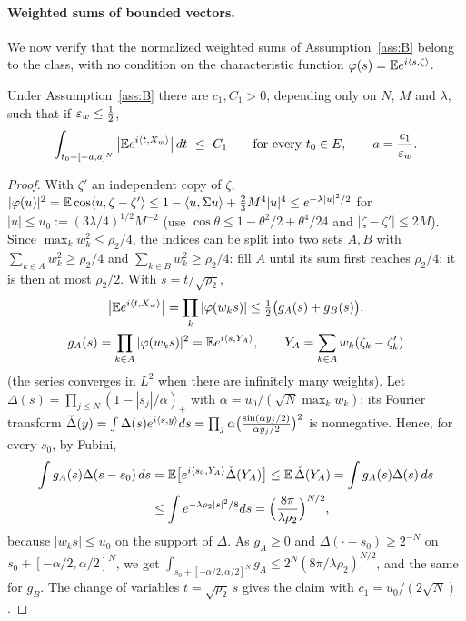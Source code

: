 \paragraph{Weighted sums of bounded vectors.} We now verify that the normalized weighted sums of
Assumption~\ref{ass:B} belong to the class, with no condition on the characteristic function
$\varphi(s)=\mathbb{E} e^{i\langle s, \zeta\rangle}$.

\begin{lemma}\label{lem:cube}
Under Assumption~\ref{ass:B} there are $c_1,C_1>0$, depending only on $N$, $M$ and $\lambda$, such that if $\varepsilon_w\le\frac12$,
\[
\int_{t_0+[-a,a]^N}\big|\mathbb{E} e^{i\langle t, X_w\rangle}\big|\,dt\ \le\ C_1\qquad\text{for every }t_0\in E,\qquad a=\frac{c_1}{\varepsilon_w}.
\]
\end{lemma}
\begin{proof}
With $\zeta'$ an independent copy of $\zeta$,
$|\varphi(u)|^2=\mathbb{E}\cos\langle u, \zeta-\zeta'\rangle\le1-\langle u, \Sigma u\rangle+\frac23M^4|u|^4\le e^{-\lambda|u|^2/2}$ for
$|u|\le u_0:=(3\lambda/4)^{1/2}M^{-2}$ (use $\cos\theta\le1-\theta^2/2+\theta^4/24$ and $|\zeta-\zeta'|\le2M$). Since
$\max_kw_k^2\le\rho_2/4$, the indices can be split into two sets $A,B$ with $\sum_{k\in A}w_k^2\ge\rho_2/4$ and
$\sum_{k\in B}w_k^2\ge\rho_2/4$: fill $A$ until its sum first reaches $\rho_2/4$; it is then at most $\rho_2/2$. With
$s=t/\sqrt{\rho_2}$,
\begin{gather*}
\big|\mathbb{E} e^{i\langle t, X_w\rangle}\big|=\prod_k|\varphi(w_ks)|\le\tfrac12\big(g_A(s)+g_B(s)\big),\\
g_A(s)=\prod_{k\in A}|\varphi(w_ks)|^2=\mathbb{E} e^{i\langle s, Y_A\rangle},\qquad Y_A=\sum_{k\in A}w_k(\zeta_k-\zeta'_k)
\end{gather*}
(the series converges in $L^2$ when there are infinitely many weights). Let $\Delta(s)=\prod_{j\le N}(1-|s_j|/\alpha)_+$
with $\alpha=u_0/(\sqrt N\max_kw_k)$; its Fourier transform
$\check\Delta(y)=\int\Delta(s)e^{i\langle s, y\rangle}ds=\prod_j\alpha\big(\frac{\sin(\alpha y_j/2)}{\alpha y_j/2}\big)^2$ is
nonnegative. Hence, for every $s_0$, by Fubini,
\begin{align*}
\int g_A(s)\Delta(s-s_0)\,ds&=\mathbb{E}\big[e^{i\langle s_0, Y_A\rangle}\check\Delta(Y_A)\big]\le\mathbb{E}\,\check\Delta(Y_A)=\int g_A(s)\Delta(s)\,ds\\
&\le\int e^{-\lambda\rho_2|s|^2/8}ds=\Big(\frac{8\pi}{\lambda\rho_2}\Big)^{N/2},
\end{align*}
because $|w_ks|\le u_0$ on the support of $\Delta$. As $g_A\ge0$ and $\Delta(\cdot-s_0)\ge2^{-N}$ on
$s_0+[-\alpha/2,\alpha/2]^N$, we get $\int_{s_0+[-\alpha/2,\alpha/2]^N}g_A\le2^N(8\pi/\lambda\rho_2)^{N/2}$, and the same for
$g_B$. The change of variables $t=\sqrt{\rho_2}\,s$ gives the claim with $c_1=u_0/(2\sqrt N)$.
\end{proof}

